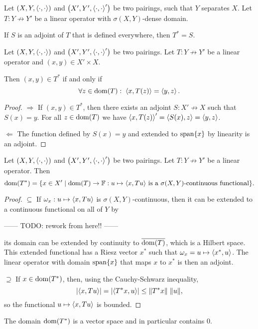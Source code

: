 \begin{lemma}
Let $\sSet{X,Y,\pair{\cdot,\cdot}}$ and $\sSet{X',Y',\pair{\cdot,\cdot}'}$ be two pairings, such that $Y$ separates $X$. Let $T: Y\not\to Y'$ be a linear operator with $\sigma(X,Y)$-dense domain.

If $S$ is an adjoint of $T$ that is defined everywhere, then $T^* = S$.
\end{lemma}

\begin{lemma} \label{pairAdjointRelationLemma}
Let $\sSet{X,Y,\pair{\cdot,\cdot}}$ and $\sSet{X',Y',\pair{\cdot,\cdot}'}$ be two pairings. Let $T: Y\not\to Y'$ be a linear operator and $(x,y)\in X'\times X$.

Then $(x, y)\in T^*$ \textup{if and only if}
\[ \forall z\in\operatorname{dom}(T): \; \left\langle x, T(z) \right\rangle = \left\langle y, z \right\rangle. \]
\end{lemma}
\begin{proof}
$\boxed{\Rightarrow}$ If $(x, y)\in T^*$, then there exists an adjoint $S: X'\not\to X$ such that $S(x) = y$. For all $z\in \operatorname{dom}(T)$ we have $\left\langle x, T(z) \right\rangle' = \left\langle S(x), z \right\rangle = \left\langle y, z \right\rangle$.

$\boxed{\Leftarrow}$ The function defined by $S(x) = y$ and extended to $\operatorname{span}\{x\}$ by linearity is an adjoint.
\end{proof}

\begin{proposition} \label{pairAdjointDomain}
Let $\sSet{X,Y,\pair{\cdot,\cdot}}$ and $\sSet{X',Y',\pair{\cdot,\cdot}'}$ be two pairings. Let $T: Y\not\to Y'$ be a linear operator. Then
\[ \dom(T^*) = \setbuilder{x\in X'}{\text{$\dom(T)\to \F: u\mapsto \pair{x, Tu}$ is a $\sigma(X,Y)$-continuous functional}}. \]
\end{proposition}
\begin{proof}
$\boxed{\subseteq}$ If $\omega_x: u\mapsto \inner{x, Tu}$ is $\sigma(X,Y)$-continuous, then it can be extended to a continuous functional on all of $Y$ by 


------ TODO: rework from here!! ------

its domain can be extended by continuity to $\overline{\operatorname{dom}(T)}$, which is a Hilbert space. This extended functional has a Riesz vector $x^*$ such that $\omega_x = u\mapsto \inner{x^*, u}$. The linear operator with domain $\operatorname{span}\{x\}$ that maps $x$ to $x^*$ is then an adjoint.

$\boxed{\supseteq}$ If $x\in\operatorname{dom}(T^*)$, then, using the Cauchy-Schwarz inequality,
\[ |\inner{x,Tu}| = |\inner{T^*x,u}| \leq \norm{T^*x}\;\norm{u}, \]
so the functional $u\mapsto \inner{x, Tu}$ is bounded.
\end{proof}
\begin{corollary}
The domain $\operatorname{dom}(T^*)$ is a vector space and in particular contains $0$.
\end{corollary}

